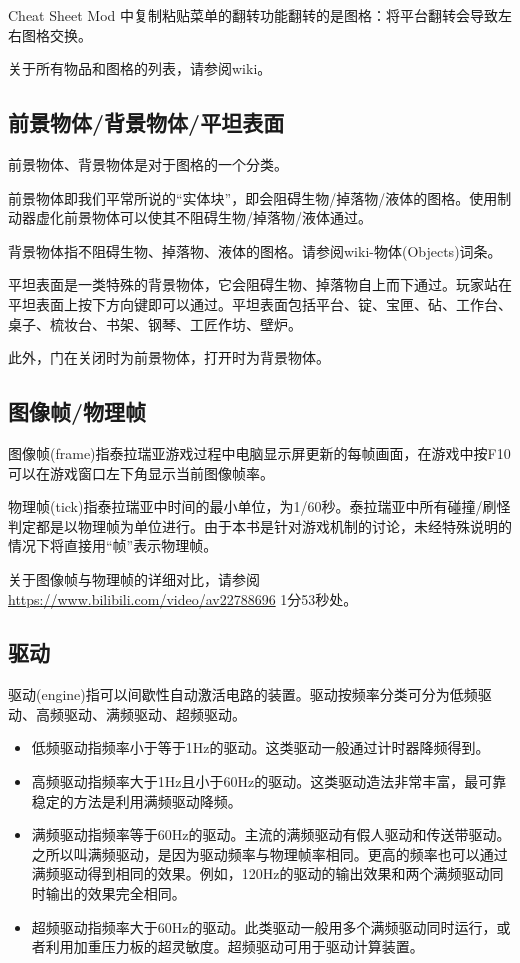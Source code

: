 Cheat Sheet Mod 中复制粘贴菜单的翻转功能翻转的是图格：将平台翻转会导致左右图格交换。

关于所有物品和图格的列表，请参阅wiki。

\subsection{前景物体/背景物体/平坦表面}

前景物体、背景物体是对于图格的一个分类。

前景物体即我们平常所说的“实体块”，即会阻碍生物/掉落物/液体的图格。使用制动器虚化前景物体可以使其不阻碍生物/掉落物/液体通过。

背景物体指不阻碍生物、掉落物、液体的图格。请参阅wiki-物体(Objects)词条。

平坦表面是一类特殊的背景物体，它会阻碍生物、掉落物自上而下通过。玩家站在平坦表面上按下方向键即可以通过。平坦表面包括平台、锭、宝匣、砧、工作台、桌子、梳妆台、书架、钢琴、工匠作坊、壁炉。

此外，门在关闭时为前景物体，打开时为背景物体。

\subsection{图像帧/物理帧}

图像帧(frame)指泰拉瑞亚游戏过程中电脑显示屏更新的每帧画面，在游戏中按F10可以在游戏窗口左下角显示当前图像帧率。

物理帧(tick)指泰拉瑞亚中时间的最小单位，为1/60秒。泰拉瑞亚中所有碰撞/刷怪判定都是以物理帧为单位进行。由于本书是针对游戏机制的讨论，未经特殊说明的情况下将直接用“帧”表示物理帧。

关于图像帧与物理帧的详细对比，请参阅\url{https://www.bilibili.com/video/av22788696} 1分53秒处。

\subsection{驱动}

驱动(engine)指可以间歇性自动激活电路的装置。驱动按频率分类可分为低频驱动、高频驱动、满频驱动、超频驱动。

\begin{itemize}
\item 低频驱动指频率小于等于1Hz的驱动。这类驱动一般通过计时器降频得到。
\item 高频驱动指频率大于1Hz且小于60Hz的驱动。这类驱动造法非常丰富，最可靠稳定的方法是利用满频驱动降频。
\item 满频驱动指频率等于60Hz的驱动。主流的满频驱动有假人驱动和传送带驱动。之所以叫满频驱动，是因为驱动频率与物理帧率相同。更高的频率也可以通过满频驱动得到相同的效果。例如，120Hz的驱动的输出效果和两个满频驱动同时输出的效果完全相同。
\item 超频驱动指频率大于60Hz的驱动。此类驱动一般用多个满频驱动同时运行，或者利用加重压力板的超灵敏度。超频驱动可用于驱动计算装置。
\end{itemize}


